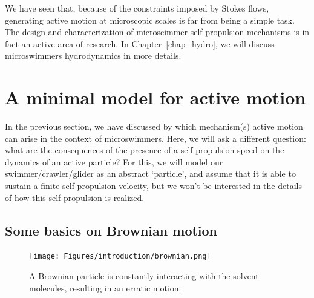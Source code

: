 We have seen that, because of the constraints imposed by Stokes flows, generating active motion at microscopic scales is far from being a simple task. The design and characterization of microscimmer self-propulsion mechanisms is in fact an active area of research. 
In Chapter~\ref{chap_hydro}, we will discuss microswimmers hydrodynamics in more details.


\section{A minimal model for active motion}
\label{intro_ABM}

In the previous section, we have discussed by which mechanism(s) active motion can arise in the context of microswimmers.
Here, we will ask a different question: what are the consequences of the presence of a self-propulsion speed on the dynamics of an active particle?
For this, we will model our swimmer/crawler/glider as an abstract `particle', and assume that it is able to sustain a finite self-propulsion velocity, but we won't be interested in the details of how this self-propulsion is realized.


\subsection*{Some basics on Brownian motion}

\begin{figure}[!htb]
    \centering
    \texttt{[image: Figures/introduction/brownian.png]}
    \caption{A Brownian particle is constantly interacting with the solvent molecules, resulting in an erratic motion.}
    \label{fig: brownian}
\end{figure}

